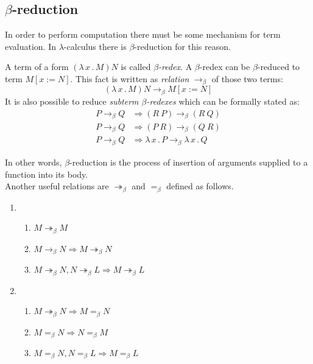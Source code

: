 \documentclass{sig-alternate}
\newcommand{\then}{\Rightarrow\xspace}
\newcommand{\lamb}[2]{( \lambda \, #1 \, . \, #2 )}
\newcommand{\lam}[2]{\lambda \, #1 \, . \, #2}
\newcommand{\bbarr}{\twoheadrightarrow_\beta}
\newcommand{\barr}{\rightarrow_\beta}
\newcommand{\beq}{=_\beta}
\begin{document}
\subsection{$\beta$-reduction}

In order to perform computation there must be some
mechanism for term evaluation. In $\lambda$-calculus there
is $\beta$-reduction for this reason.\\

\newcommand{\bRedex}{$\beta$-redex\xspace}
\newcommand{\bRedexes}{$\beta$-redexes\xspace}
\newcommand{\bArrow}{\rightarrow_\beta\xspace}
\newcommand{\eArrow}{\rightarrow_\eta\xspace}
\newcommand{\eeArrow}{\rightarrow_{\eta^{-1}}\xspace}

A term of a form $\lamb{x}{M}N$ is called \textit{\bRedex}.
A \bRedex can be $\beta$-reduced to term $M[x:=N]$. 
This fact is written as \textit{relation} $\bArrow$ 
of those two terms:
\begin{equation} \label{eq:bRed}
\lamb{x}{M}N \bArrow M[x:=N]
\end{equation}
It is also possible to reduce \textit{subterm \bRedexes} 
which can be formally stated as:
\begin{align*}
P \bArrow Q &\then (R~P)      \bArrow (R~Q) \\
P \bArrow Q &\then (P~R)      \bArrow (Q~R) \\
P \bArrow Q &\then \lam{x}{P} \bArrow \lam{x}{Q}  
\end{align*}

In other words, $\beta$-reduction is the process 
of insertion of arguments supplied to a function into 
its body. \\

Another useful relations are $\bbarr$ and $\beq$ defined as follows. 

\begin{enumerate}
 \item \begin{enumerate}
 	\item $M \bbarr M$
 	\item $M \barr N \then M \bbarr N$
 	\item $M \bbarr N , N \bbarr L \then M \bbarr L$ 	
 \end{enumerate}
 \item \begin{enumerate}
 	\item $M \bbarr N \then M \beq N$
 	\item $M \beq N \then N \beq M$
 	\item $M \beq N , N \beq L \then M \beq L$
 \end{enumerate}

\end{enumerate}
\end{document}
